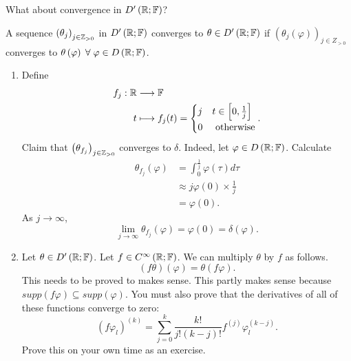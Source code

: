 What about convergence in $D'\left( \mathbb{R}; \mathbb{F} \right) $?

\begin{definition}
	A sequence $\left( \theta_{j} \right) _{j \in  \mathbb{Z}_{>0}}$ in $D'\left( \mathbb{R}; \mathbb{F} \right) $ converges to $\theta \in D'\left( \mathbb{R}; \mathbb{F} \right) $ if $\left( \theta_{j}\left(  \varphi   \right)  \right)_{j \in  Z_{>0}} $ converges to $\theta \left( \varphi \right) \forall \varphi \in D\left( \R; \F \right) $. 
\end{definition}

\begin{eg}
	\begin{enumerate}
		\item Define \begin{align*}
			f_{j}: \mathbb{R} &\longrightarrow \mathbb{F} \\
			t &\longmapsto f_{j}(t) = \begin{cases}
				j & t \in \left[ 0, \frac{1}{j} \right] \\
				0 & \text{ otherwise}
			\end{cases}
		.\end{align*}
		Claim that $\left( \theta_{f_{j}} \right) _{j \in  \mathbb{Z}_{>0}}$ converges to $\delta$. Indeed, let $\varphi \in  D\left( \mathbb{R}; \mathbb{F} \right) $. Calculate
		\begin{align*}
			\theta_{f_{j}}\left( \varphi \right)  &= \int_{0}^{\frac{1}{j}} \varphi\left( \tau \right) d \tau  \\
							      &\approx j \varphi\left( 0 \right)  \times  \frac{1}{j} \\
							      &= \varphi\left( 0 \right) 
		.\end{align*}
		As $j \to \infty$, 
		\[
			\lim_{j \to \infty} \theta_{f_{j}}\left( \varphi \right)  = \varphi\left( 0 \right) = \delta\left( \varphi \right) 
		.\] 
	\item Let $\theta \in  D'\left( \mathbb{R}; \mathbb{F} \right) $. Let $f \in C^{\infty}\left( \mathbb{R}; \mathbb{F} \right) $. We can multiply $\theta $ by $f$ as follows.
		\[
			\left( f \theta \right)\left( \varphi \right) = \theta \left( f\varphi \right)  
		.\]
This needs to be proved to makes sense. This partly makes sense because $supp\left( f \varphi \right) \subseteq supp\left( \varphi \right) $.  You must also prove that the derivatives of all of these functions converge to zero: 
\[
	\left( f\varphi _{l}\right) ^{\left( k \right) } = \sum_{j=0}^{k} \frac{k!}{j! \left( k-j \right) !} f^{\left( j \right) } \varphi_{l}^{\left( k - j \right) }
.\]
Prove this on your own time as an exercise. 
	\end{enumerate}
\end{eg}

